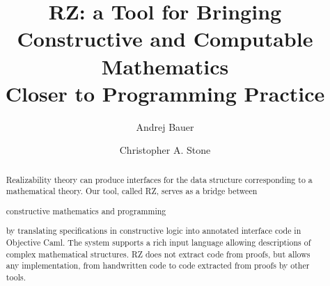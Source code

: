 \documentclass{llncs}
\newif\iflong
\begin{document}
\title{RZ: a Tool for Bringing\\
  Constructive and Computable Mathematics\\
  Closer to Programming Practice}
\author{
  Andrej Bauer \and
  Christopher A. Stone}

\maketitle

\begin{abstract}
  Realizability theory 
\iflong 
  is not only a fundamental tool in logic
  and computability, but also 
  has direct application to the design and
  implementation of programs: it
\fi %
  can produce interfaces for the data
  structure corresponding to a
  mathematical theory.
%
  Our tool, called RZ,
  serves as a bridge between
\iflong the worlds of \fi
  constructive
  mathematics and programming%
\iflong 
.
By using the realizability
  interpretation of constructive mathematics, RZ 
  translates
\else
by translating
\fi %
  specifications in constructive logic into annotated
  interface code in Objective Caml.
%
  The system supports
  a rich input language allowing descriptions of
  complex mathematical structures. RZ does not extract code from
  proofs, but allows any implementation, from handwritten code to code extracted from
  proofs by other tools.
\end{abstract}











{

}

\iflong
\appendix

\fi %
\end{document}
